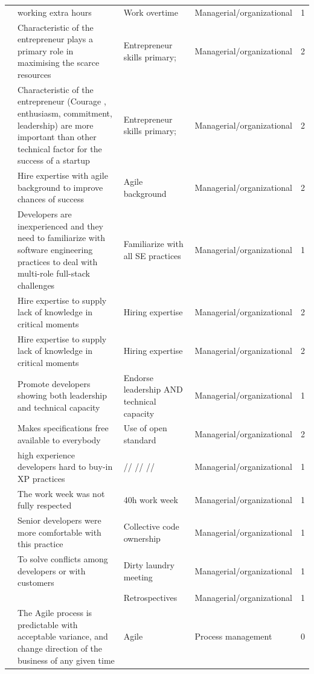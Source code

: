 \documentclass[final,5p,times,twocolumn]{elsarticle}
\begin{document}
\begin{center}
\begin{longtable}{|p{0.4in}|p{3in}|p{1.3in}|p{1in}|p{0.3in}|}
\cite{Camel1994a} & working extra hours & Work overtime & Managerial/organizational & 1 \\
\cite{Chorev2006} & Characteristic of the entrepreneur plays a primary role in maximising the scarce resources & Entrepreneur skills primary; & Managerial/organizational & 2 \\
\cite{Kakati2003} & Characteristic of the entrepreneur (Courage , enthusiasm, commitment, leadership) are more important than other technical factor for the success of a startup & Entrepreneur skills primary; & Managerial/organizational & 2 \\
\cite{Coleman2008} & Hire expertise with agile background to improve chances of success & Agile background & Managerial/organizational & 2 \\
\cite{Crowne2002} & Developers are inexperienced and they need to familiarize with software engineering practices to deal with multi-role full-stack challenges & Familiarize with all SE practices & Managerial/organizational & 1 \\
\cite{Coleman2007} & Hire expertise to supply lack of knowledge in critical moments & Hiring expertise & Managerial/organizational & 2 \\
\cite{Coleman2008a} & Hire expertise to supply lack of knowledge in critical moments & Hiring expertise & Managerial/organizational & 2 \\
\cite{Crowne2002} & Promote developers showing both leadership and technical capacity & Endorse leadership AND technical capacity & Managerial/organizational & 1 \\
\cite{Yoffie1999} & Makes specifications free available to everybody & Use of open standard & Managerial/organizational & 2 \\
\cite{Deias} & high experience developers hard to buy-in XP practices & //  // // & Managerial/organizational & 1 \\
\cite{Silva2005} & The work week was not fully respected & 40h work week & Managerial/organizational & 1 \\
\cite{Silva2005} & Senior developers were more comfortable with this practice & Collective code ownership & Managerial/organizational & 1 \\
\cite{Silva2005} & To solve conflicts among developers or with customers & Dirty laundry meeting & Managerial/organizational & 1 \\
\cite{Silva2005} &       & Retrospectives & Managerial/organizational & 1 \\
\cite{Taipale2010} & The Agile process is predictable with acceptable variance, and change direction of the business of any given time & Agile & Process management & 0 \\

\end{longtable}
\end{center}
\end{document}
